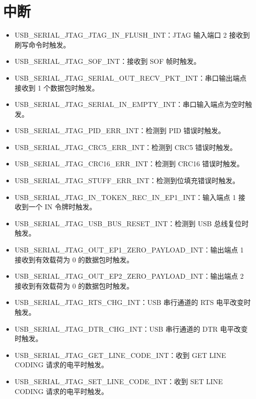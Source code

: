 \documentclass[main\_\_CN.tex]{subfiles}
\begin{document}
\section{中断}

\begin{itemize}
    \item \label{int:USBSERIALJTAGJTAGINFLUSHINT}USB\_SERIAL\_JTAG\_JTAG\_IN\_FLUSH\_INT：JTAG 输入端口 2 接收到刷写命令时触发。
    \item \label{int:USBSERIALJTAGSOFINT}USB\_SERIAL\_JTAG\_SOF\_INT：接收到 SOF 帧时触发。
    \item \label{int:USBSERIALJTAGSERIALOUTRECVPKTINT}USB\_SERIAL\_JTAG\_SERIAL\_OUT\_RECV\_PKT\_INT：串口输出端点接收到 1 个数据包时触发。
    \item \label{int:USBSERIALJTAGSERIALINEMPTYINT}USB\_SERIAL\_JTAG\_SERIAL\_IN\_EMPTY\_INT：串口输入端点为空时触发。
    \item \label{int:USBSERIALJTAGPIDERRINT}USB\_SERIAL\_JTAG\_PID\_ERR\_INT：检测到 PID 错误时触发。
    \item \label{int:USBSERIALJTAGCRC5ERRINT}USB\_SERIAL\_JTAG\_CRC5\_ERR\_INT：检测到 CRC5 错误时触发。
    \item \label{int:USBSERIALJTAGCRC16ERRINT}USB\_SERIAL\_JTAG\_CRC16\_ERR\_INT：检测到 CRC16 错误时触发。
    \item \label{int:USBSERIALJTAGSTUFFERRINT}USB\_SERIAL\_JTAG\_STUFF\_ERR\_INT：检测到位填充错误时触发。
    \item \label{int:USBSERIALJTAGINTOKENRECINEP1INT}USB\_SERIAL\_JTAG\_IN\_TOKEN\_REC\_IN\_EP1\_INT：输入端点 1 接收到一个 IN 令牌时触发。
    \item \label{int:USBSERIALJTAGUSBBUSRESETINT}USB\_SERIAL\_JTAG\_USB\_BUS\_RESET\_INT：检测到 USB 总线复位时触发。
    \item \label{int:USBSERIALJTAGOUTEP1ZEROPAYLOADINT}USB\_SERIAL\_JTAG\_OUT\_EP1\_ZERO\_PAYLOAD\_INT：输出端点 1 接收到有效载荷为 0 的数据包时触发。
    \item \label{int:USBSERIALJTAGOUTEP2ZEROPAYLOADINT}USB\_SERIAL\_JTAG\_OUT\_EP2\_ZERO\_PAYLOAD\_INT：输出端点 2 接收到有效载荷为 0 的数据包时触发。
    \item \label{int:USBSERIALJTAGRTSCHGINT}USB\_SERIAL\_JTAG\_RTS\_CHG\_INT：USB 串行通道的 RTS 电平改变时触发。
    \item \label{int:USBSERIALJTAGDTRCHGINT}USB\_SERIAL\_JTAG\_DTR\_CHG\_INT：USB 串行通道的 DTR 电平改变时触发。
    \item \label{int:USBSERIALJTAGGETLINECODEINT}USB\_SERIAL\_JTAG\_GET\_LINE\_CODE\_INT：收到 GET LINE CODING 请求的电平时触发。
    \item \label{int:USBSERIALJTAGSETLINECODEINT}USB\_SERIAL\_JTAG\_SET\_LINE\_CODE\_INT：收到 SET LINE CODING 请求的电平时触发。

\end{itemize}
\end{document}
